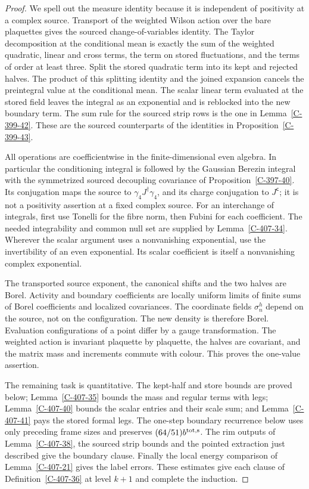 \documentclass[11pt,letterpaper,reqno]{amsart}
\theoremstyle{definition}
\theoremstyle{remark}
\begin{document}
\begin{proof}
We spell out the measure identity because it is independent of
positivity at a complex source. Transport of the weighted
Wilson action over the bare plaquettes gives the sourced
change-of-variables identity. The Taylor decomposition at the
conditional mean is exactly the sum of the weighted quadratic,
linear and cross terms, the term on stored fluctuations, and
the terms of order at least three. Split the stored quadratic
term into its kept and rejected halves. The product of this
splitting identity and the joined expansion cancels the
preintegral value at the conditional mean. The scalar linear
term evaluated at the stored field leaves the integral as an
exponential and is reblocked into the new boundary term. The
sum rule for the sourced strip rows is the one in
Lemma~\ref{C-399-42}. These are the sourced counterparts of
the identities in Proposition~\ref{C-399-43}.

All operations are coefficientwise in the finite-dimensional
even algebra. In particular the conditioning integral is
followed by the Gaussian Berezin integral with the symmetrized
sourced decoupling covariance of Proposition~\ref{C-397-40}.
Its conjugation maps the source to $\gamma_4J^\dagger\gamma_4$,
and its charge conjugation to $J^{\mathsf c}$; it is not a
positivity assertion at a fixed complex source. For an
interchange of integrals, first use Tonelli for the fibre norm,
then Fubini for each coefficient. The needed integrability and
common null set are supplied by Lemma~\ref{C-407-34}. Wherever
the scalar argument uses a nonvanishing exponential, use the
invertibility of an even exponential. Its scalar coefficient
is itself a nonvanishing complex exponential.

The transported source exponent, the canonical shifts and the
two halves are Borel. Activity and boundary coefficients are
locally uniform limits of finite sums of Borel coefficients
and localized covariances. The coordinate fields $\sigma_n^h$
depend on the source, not on the configuration. The new density
is therefore Borel. Evaluation configurations of a point
differ by a gauge transformation. The weighted action is
invariant plaquette by plaquette, the halves are covariant,
and the matrix mass and increments commute with colour. This
proves the one-value assertion.

The remaining task is quantitative. The kept-half and store
bounds are proved below; Lemma~\ref{C-407-35} bounds the mass
and regular terms with legs; Lemma~\ref{C-407-40} bounds the
scalar entries and their scale sum; and
Lemma~\ref{C-407-41} pays the stored formal legs. The one-step
boundary recurrence below uses only preceding frame sizes and
preserves $(64/51)b^{\rm tot,s}$. The rim outputs of
Lemma~\ref{C-407-38}, the sourced strip bounds and the pointed
extraction just described give the boundary clause. Finally
the local energy comparison of Lemma~\ref{C-407-21} gives the
label errors. These estimates give each clause of
Definition~\ref{C-407-36} at level $k+1$ and complete the
induction.
\end{proof}
\end{document}
